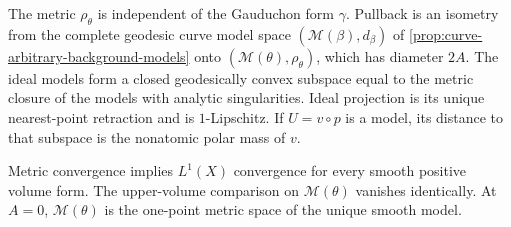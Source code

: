 \begin{proposition}\label{fibration:polar-model-metric}
The metric $\rho_\theta$ is independent of the Gauduchon form
$\gamma$. Pullback is an isometry from the complete geodesic
curve model space $(\mathcal M(\beta),d_\beta)$ of
\cref{prop:curve-arbitrary-background-models} onto
$(\mathcal M(\theta),\rho_\theta)$, which has diameter $2A$. The ideal models form a closed geodesically
convex subspace equal to the metric closure of the models with
analytic singularities. Ideal projection is its unique
nearest-point retraction and is $1$-Lipschitz. If $U=v\circ p$ is
a model, its distance to that subspace is the nonatomic polar
mass of $v$.

Metric convergence implies $L^1(X)$ convergence for every smooth
positive volume form. The upper-volume comparison on
$\mathcal M(\theta)$ vanishes identically. At $A=0$, $\mathcal M(\theta)$ is the
one-point metric space of the unique smooth model.
\end{proposition}
